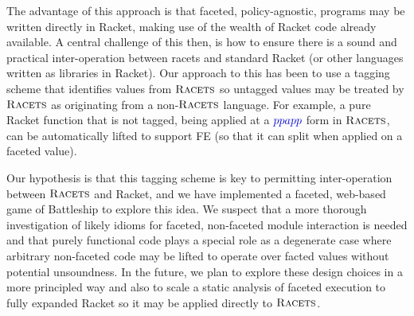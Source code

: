 \documentclass[review=true,acmlarge]{acmart}
\newcommand*{\SavedLstInline}{}
\DeclareRobustCommand*{\lstinline}{%
  \ifmmode
    \let\SavedBGroup\bgroup
    \def\bgroup{%
      \let\bgroup\SavedBGroup
      \hbox\bgroup
    }%
  \fi
  \SavedLstInline
}
\newcommand{\colorMATH}{black!20!blue}
\newcommand{\blue}[1] {{\color{\colorMATH} #1}}
\newcommand{\code}[1]{\lstinline{#1}}
\newcommand{\racets}[0]{$\textsc{Racets}$\xspace}
\begin{document}
The advantage of this approach is that faceted, policy-agnostic, programs may be written
directly in Racket, making use of the wealth of Racket code already available.
A central challenge of this then, is how to ensure there is a sound and practical inter-operation
between racets and standard Racket (or other languages written as libraries in Racket). Our
approach to this has been to use a tagging scheme that identifies values from \racets
so untagged values may be treated by \racets as originating from a non-\racets language.
For example, a pure Racket function that is not tagged, being applied at a $\blue{\code{ppapp}}$
form in \racets, can be automatically lifted to support FE (so that it can split when applied
on a faceted value).

Our hypothesis is that this tagging scheme is key to permitting inter-operation
between \racets and Racket, and we have implemented a faceted, web-based game of Battleship
to explore this idea. We suspect that a more thorough investigation of likely idioms
for faceted, non-faceted module interaction is needed and that purely functional code
plays a special role as a degenerate case where arbitrary non-faceted code may be lifted
to operate over facted values without potential unsoundness. In the future, we plan to explore
these design choices in a more principled way and also to scale a static analysis of faceted
execution to fully expanded Racket so it may be applied directly to \racets.





\end{document}
